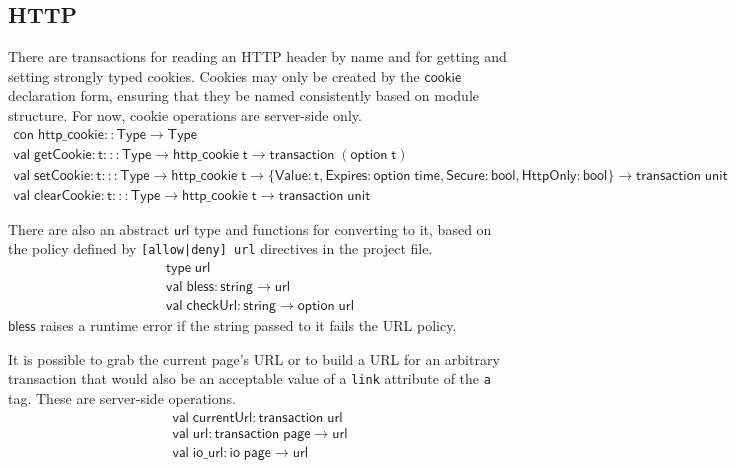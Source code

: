 \documentclass{article}
\newcommand{\mt}[1]{\mathsf{#1}}
\begin{document}
\subsection{HTTP}

There are transactions for reading an HTTP header by name and for getting and setting strongly typed cookies.  Cookies may only be created by the $\mt{cookie}$ declaration form, ensuring that they be named consistently based on module structure.  For now, cookie operations are server-side only.
$$\begin{array}{l}
  \mt{con} \; \mt{http\_cookie} :: \mt{Type} \to \mt{Type} \\
  \mt{val} \; \mt{getCookie} : \mt{t} ::: \mt{Type} \to \mt{http\_cookie} \; \mt{t} \to \mt{transaction} \; (\mt{option} \; \mt{t}) \\
  \mt{val} \; \mt{setCookie} : \mt{t} ::: \mt{Type} \to \mt{http\_cookie} \; \mt{t} \to \{\mt{Value} : \mt{t}, \mt{Expires} : \mt{option} \; \mt{time}, \mt{Secure} : \mt{bool}, \mt{HttpOnly} : \mt{bool}\} \to \mt{transaction} \; \mt{unit} \\
  \mt{val} \; \mt{clearCookie} : \mt{t} ::: \mt{Type} \to \mt{http\_cookie} \; \mt{t} \to \mt{transaction} \; \mt{unit}
\end{array}$$

There are also an abstract $\mt{url}$ type and functions for converting to it, based on the policy defined by \texttt{[allow|deny] url} directives in the project file.
$$\begin{array}{l}
  \mt{type} \; \mt{url} \\
  \mt{val} \; \mt{bless} : \mt{string} \to \mt{url} \\
  \mt{val} \; \mt{checkUrl} : \mt{string} \to \mt{option} \; \mt{url}
\end{array}$$
$\mt{bless}$ raises a runtime error if the string passed to it fails the URL policy.

It is possible to grab the current page's URL or to build a URL for an arbitrary transaction that would also be an acceptable value of a \texttt{link} attribute of the \texttt{a} tag.  These are server-side operations.
$$\begin{array}{l}
  \mt{val} \; \mt{currentUrl} : \mt{transaction} \; \mt{url} \\
  \mt{val} \; \mt{url} : \mt{transaction} \; \mt{page} \to \mt{url} \\
  \mt{val} \; \mt{io\_url} : \mt{io} \; \mt{page} \to \mt{url}
\end{array}$$
\end{document}

